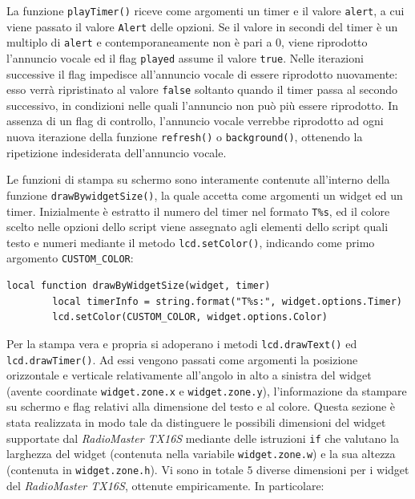 \documentclass[a4paper, 12pt]{report} %
\begin{document}
La funzione \texttt{playTimer()} riceve come argomenti un timer e il valore \texttt{alert}, a cui viene passato il valore \texttt{Alert} delle opzioni. Se il valore in secondi del timer è un multiplo di \texttt{alert} e contemporaneamente non è pari a $0$, viene riprodotto l'annuncio vocale ed il flag \texttt{played} assume il valore \texttt{true}. Nelle iterazioni successive il flag impedisce all'annuncio vocale di essere riprodotto nuovamente: esso verrà ripristinato al valore \texttt{false} soltanto quando il timer passa al secondo successivo, in condizioni nelle quali l'annuncio non può più essere riprodotto. In assenza di un flag di controllo, l'annuncio vocale verrebbe riprodotto ad ogni nuova iterazione della funzione \texttt{refresh()} o \texttt{background()}, ottenendo la ripetizione indesiderata dell'annuncio vocale.

Le funzioni di stampa su schermo sono interamente contenute all'interno della funzione \newline\texttt{drawBywidgetSize()}, la quale accetta come argomenti un widget ed un timer. Inizialmente è estratto il numero del timer nel formato \texttt{T\%s}, ed il colore scelto nelle opzioni dello script viene assegnato agli elementi dello script quali testo e numeri mediante il metodo \texttt{lcd.setColor()}, indicando come primo argomento \texttt{CUSTOM\_COLOR}: 

\begin{lstlisting}
local function drawByWidgetSize(widget, timer)
        local timerInfo = string.format("T%s:", widget.options.Timer)
        lcd.setColor(CUSTOM_COLOR, widget.options.Color)
\end{lstlisting}

Per la stampa vera e propria si adoperano i metodi \texttt{lcd.drawText()} ed \texttt{lcd.drawTimer()}. Ad essi vengono passati come argomenti la posizione orizzontale e verticale relativamente all'angolo in alto a sinistra del widget (avente coordinate \texttt{widget.zone.x} e \texttt{widget.zone.y}), l'informazione da stampare su schermo e flag relativi alla dimensione del testo e al colore. Questa sezione è stata realizzata in modo tale da distinguere le possibili dimensioni del widget supportate dal \emph{RadioMaster TX16S} mediante delle istruzioni \texttt{if} che valutano la larghezza del widget (contenuta nella variabile \texttt{widget.zone.w}) e la sua altezza (contenuta in \texttt{widget.zone.h}). Vi sono in totale $5$ diverse dimensioni per i widget del \emph{RadioMaster TX16S}, ottenute empiricamente. In particolare:
\end{document}
